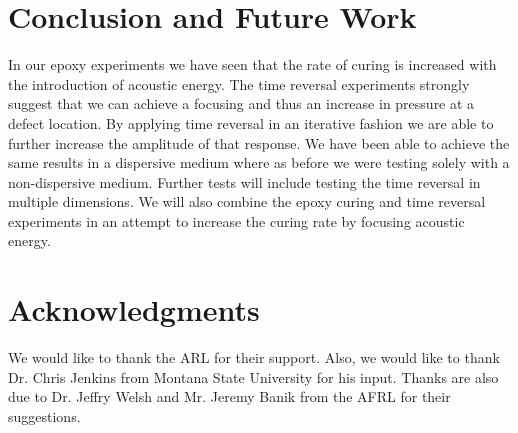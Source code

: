 \documentclass[]{aiaa-tc}%
\begin{document}
\section{Conclusion and Future Work}

In our epoxy experiments we have seen that the rate of curing is increased with the introduction of acoustic energy. The time reversal experiments strongly suggest that we can achieve a focusing and thus an increase in pressure at a defect location. By applying time reversal in an iterative fashion we are able to further increase the amplitude of that response. We have been able to achieve the same results in a dispersive medium where as before we were testing solely with a non-dispersive medium. Further tests will include testing the time reversal in multiple dimensions. We will also combine the epoxy curing and time reversal experiments in an attempt to increase the curing rate by focusing acoustic energy.

\section{Acknowledgments}

We would like to thank the ARL for their support. Also, we would like to thank Dr. Chris Jenkins from Montana State University for his input. Thanks are also due to Dr. Jeffry Welsh and Mr. Jeremy Banik from the AFRL for their suggestions.

{}

\end{document}

